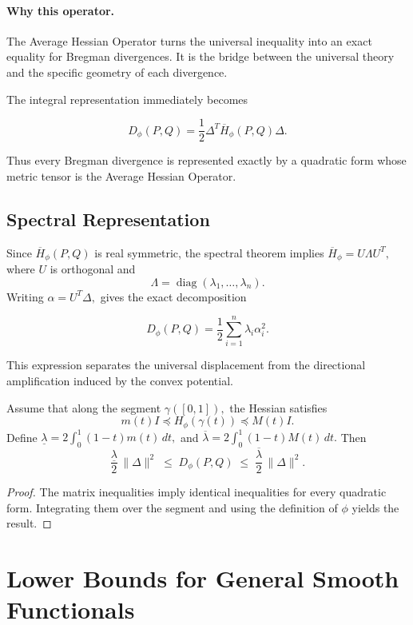 \paragraph{Why this operator.}
The Average Hessian Operator turns the universal inequality into an exact equality for Bregman divergences.  It is the bridge between the universal theory and the specific geometry of each divergence.

The integral representation immediately becomes
\begin{theorem}
\label{ch:thm:15-2}
\[ \boxed{
D_\phi(P,Q)
=
\frac12
\Delta^T
\overline H_\phi(P,Q)
\Delta.
} \]
\end{theorem}
Thus every Bregman divergence is represented exactly by a quadratic form
whose metric tensor is the Average Hessian Operator.
\subsection{Spectral Representation}\label{ch:cor:15-1}
Since
$\overline H_\phi(P,Q)$
is real symmetric, the spectral theorem implies
$\overline H_\phi = U\Lambda U^T,$
where \(U\) is orthogonal and
\[
\Lambda=\operatorname{diag}(\lambda_1,\ldots,\lambda_n).
\]
Writing
$\alpha=U^T\Delta,$
gives the exact decomposition
\begin{corollary}

\[ \boxed{
D_\phi(P,Q)
=
\frac12
\sum_{i=1}^{n}
\lambda_i\alpha_i^2.
} \]
\end{corollary}
This expression separates the universal displacement from the
directional amplification induced by the convex potential.
\begin{theorem}\label{ch:thm:15-3}
Assume that along the segment
$\gamma([0,1]),$
the Hessian satisfies
\[ m(t)I \preceq H_\phi(\gamma(t))
\preceq M(t)I. \]
Define
$\underline\lambda = 2\int_0^{1}(1-t)m(t)\,dt,$
and
$\overline\lambda = 2\int_0^{1}(1-t)M(t)\,dt.$
Then
\[ \boxed{
\frac{\underline\lambda}{2}\,\|\Delta\|^2
\;\le\; D_\phi(P,Q)
\;\le\; \frac{\overline\lambda}{2}\,\|\Delta\|^2.
} \]
\end{theorem}
\begin{proof}
The matrix inequalities imply identical inequalities for every quadratic
form. Integrating them over the segment and using the definition of
\(\phi\) yields the result. 
\end{proof}


\section{Lower Bounds for General Smooth Functionals}\label{ch:sec:lower-bounds-for-general-smooth-functionals}

